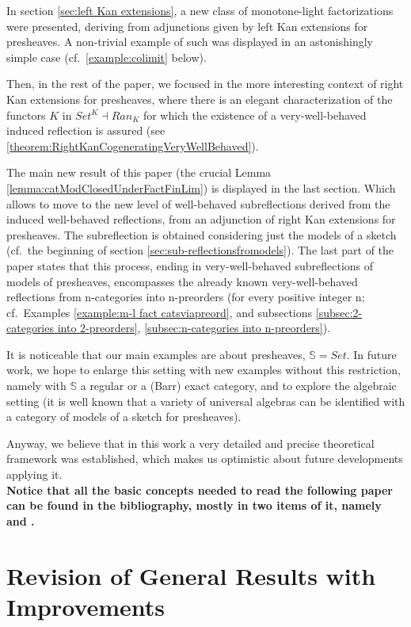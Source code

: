 \documentclass[12pt,a4paper]{amsart}
\theoremstyle{definition}
\begin{document}
In section \ref{sec:left Kan extensions}, a new class of monotone-light factorizations were presented, deriving from adjunctions given by left Kan extensions for presheaves. A non-trivial example of such was displayed in an astonishingly simple case (cf.\ \ref{example:colimit} below).

Then, in the rest of the paper, we focused in the more interesting context of right Kan extensions for presheaves, where there is an elegant characterization of the functors $K$ in $Set^K\dashv Ran_K$ for which the existence of a very-well-behaved induced reflection is assured (see \ref{theorem:RightKanCogeneratingVeryWellBehaved}).

The main new result of this paper (the crucial Lemma \ref{lemma:catModClosedUnderFactFinLim}) is displayed in the last section. Which allows to move to the new level of well-behaved subreflections derived from the induced well-behaved reflections, from an adjunction of right Kan extensions for presheaves. The subreflection is obtained considering just the models of a sketch (cf.\ the beginning of section \ref{sec:sub-reflectionsfromodels}). The last part of the paper states that this process, ending in very-well-behaved subreflections of models of presheaves, encompasses the already known very-well-behaved reflections from n-categories into n-preorders (for every positive integer n; cf.\ Examples \ref{example:m-l fact catsviapreord}, and subsections \ref{subsec:2-categories into 2-preorders}, \ref{subsec:n-categories into n-preorders}).

It is noticeable that our main examples are about presheaves, $\mathbb{S}=Set$. In future work, we hope to enlarge this setting with new examples without this restriction, namely with $\mathbb{S}$ a regular or a (Barr) exact category, and to explore the algebraic setting (it is well known that a variety of universal algebras can be identified with a category of models of a sketch for presheaves).

Anyway, we believe that in this work a very detailed and precise theoretical framework was established, which makes us optimistic about future developments applying it.\\

\textbf{Notice that all the basic concepts needed to read the following paper can be found in the bibliography, mostly in two items of it, namely \cite{SM:cat}  and \cite{CJKP:stab}.}



\section{Revision of General Results with Improvements}\label{sec-General Results}
\end{document}
